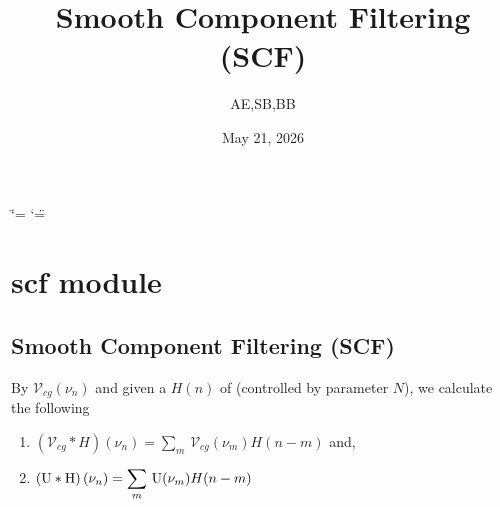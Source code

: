 \documentclass[a4paper,11pt,oneside,english,openany]{sphinxmanual}
\title{Smooth Component Filtering (SCF)}
\date{May 21, 2026}
\author{AE,SB,BB}
\begin{document}
\ifdefined\shorthandoff
  \ifnum\catcode`\=\string=\active\shorthandoff{=}\fi
  \ifnum\catcode`\"=\active{}\fi
\fi

\pagestyle{empty}
\sphinxmaketitle
\pagestyle{plain}
\sphinxtableofcontents
\pagestyle{normal}
\label{\detokenize{index::doc}}
\sphinxstepscope



\sphinxstepscope


\chapter{scf module}
\label{\detokenize{scf:module-scf}}\label{\detokenize{scf:scf-module}}\label{\detokenize{scf::doc}}

\section{Smooth Component Filtering (SCF)}
\label{\detokenize{scf:smooth-component-filtering-scf}}
\sphinxAtStartPar
By  \(\mathcal{V}_{cg}(\nu_n)\) and given a  \(H(n)\) of  (controlled by parameter \(N\)), we calculate the following \sphinxhyphen{}
\begin{enumerate}
%
\item {} 
\sphinxAtStartPar
\(\left(\mathcal{V}_{cg}\ast H\right)(\nu_n) = \displaystyle \sum_m\, \mathcal{V}_{cg}(\nu_m)H(n-m)\) and,

\item {} 
\sphinxAtStartPar
\(\left(\rm U\ast H\right)(\nu_n)    = \displaystyle\sum_m\, {\rm U}(\nu_m)H(n-m)\)

\end{enumerate}
\end{document}
